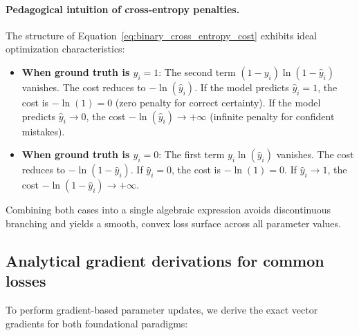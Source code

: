 \paragraph{Pedagogical intuition of cross-entropy penalties.}
The structure of Equation~\eqref{eq:binary_cross_entropy_cost} exhibits ideal optimization characteristics:
\begin{itemize}
  \item \textbf{When ground truth is $y_i = 1$}: The second term $(1 - y_i)\ln(1 - \hat{y}_i)$ vanishes. The cost reduces to $-\ln(\hat{y}_i)$. If the model predicts $\hat{y}_i = 1$, the cost is $-\ln(1) = 0$ (zero penalty for correct certainty). If the model predicts $\hat{y}_i \to 0$, the cost $-\ln(\hat{y}_i) \to +\infty$ (infinite penalty for confident mistakes).
  \item \textbf{When ground truth is $y_i = 0$}: The first term $y_i \ln(\hat{y}_i)$ vanishes. The cost reduces to $-\ln(1 - \hat{y}_i)$. If $\hat{y}_i = 0$, the cost is $-\ln(1) = 0$. If $\hat{y}_i \to 1$, the cost $-\ln(1 - \hat{y}_i) \to +\infty$.
\end{itemize}
Combining both cases into a single algebraic expression avoids discontinuous branching and yields a smooth, convex loss surface across all parameter values.

\subsection{Analytical gradient derivations for common losses}
\label{sec:analytical_gradients}

To perform gradient-based parameter updates, we derive the exact vector gradients for both foundational paradigms:

